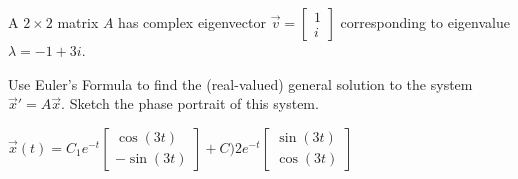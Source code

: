\begin{exercise}
A $2\times 2$ matrix $A$ has complex eigenvector $\displaystyle \vec{v}=\begin{bmatrix} 1\\ i \end{bmatrix}$ corresponding to eigenvalue $\lambda=-1+3i$. %
\begin{tasks}
\task Use Euler's Formula to find the (real-valued) general solution to the system $\vec{x}'=A\vec{x}$.
\task Sketch the phase portrait of this system.
\end{tasks}
\end{exercise}
\comboSol{%
}
{%
$\vec{x}(t) = C_1e^{-t}\left[\begin{smallmatrix} \cos(3t)\\ -\sin(3t) \end{smallmatrix}\right] + C)2e^{-t}\left[\begin{smallmatrix} \sin(3t)\\ \cos(3t) \end{smallmatrix}\right]$  \hfill{}\hfill\hfill
}

